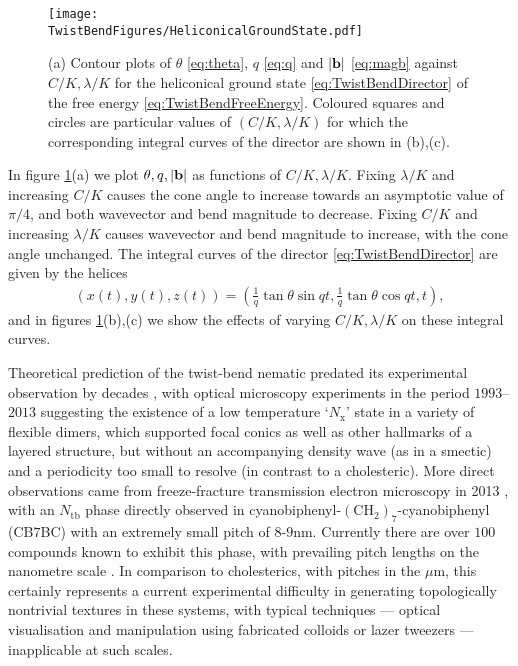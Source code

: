 \begin{figure}[htbp]
    \centering
    \texttt{[image: \\TwistBendFigures/HeliconicalGroundState.pdf]}
    \caption[Heliconical ground state of a twist-bend nematic.]{(a) Contour plots of $\theta$ \eqref{eq:theta}, $q$ \eqref{eq:q} and $|{\bf b}|$ \eqref{eq:magb} against $C/K, \lambda/K$ for the heliconical ground state \eqref{eq:TwistBendDirector} of the free energy \eqref{eq:TwistBendFreeEnergy}. Coloured squares and circles are particular values of $(C/K, \lambda /K)$ for which the corresponding integral curves of the director are shown in (b),(c).}
    \label{fig:HeliconicalGroundState}
\end{figure}
In figure \ref{fig:HeliconicalGroundState}(a) we plot $\theta, q, |\mathbf{b}|$ as functions of $C/K, \lambda/K$. Fixing $\lambda/K$ and increasing $C/K$ causes the cone angle to increase towards an asymptotic value of $\pi/4$, and both wavevector and bend magnitude to decrease. Fixing $C/K$ and increasing $\lambda/K$ causes wavevector and bend magnitude to increase, with the cone angle unchanged. The integral curves of the director \eqref{eq:TwistBendDirector} are given by the helices
\begin{align}
    (x(t),y(t),z(t)) = (\frac{1}{q} \tan \theta \sin qt, \frac{1}{q} \tan \theta \cos qt,t),
\end{align}
and in figures \ref{fig:HeliconicalGroundState}(b),(c) we show the effects of varying $C/K, \lambda/K$ on these integral curves.

Theoretical prediction of the twist-bend nematic predated its experimental observation by decades \citep{Lavrentovich2018}, with optical microscopy experiments in the period $1993$--$2013$ suggesting the existence of a low temperature `$N_\mathrm{x}$' state in a variety of flexible dimers, which supported focal conics as well as other hallmarks of a layered structure, but without an accompanying density wave (as in a smectic) and a periodicity too small to resolve (in contrast to a cholesteric). More direct observations came from freeze-fracture transmission electron microscopy in 2013 \citep{Borshch2013}, with an $N_{\mathrm{tb}}$ phase directly observed in cyanobiphenyl-$(\mathrm{CH}_2)_7$-cyanobiphenyl (CB$7$BC) with an extremely small pitch of $8$-$9$nm. Currently there are over $100$ compounds known to exhibit this phase, with prevailing pitch lengths on the nanometre scale \citep{Lavrentovich2018}. In comparison to cholesterics, with pitches in the $\mu$m, this certainly represents a current experimental difficulty in generating topologically nontrivial textures in these systems, with typical techniques --- optical visualisation and manipulation using fabricated colloids \citep{Tasinkevych2014} or lazer tweezers \citep{Tkalec2011,Copar2015,Ackerman2017} --- inapplicable at such scales. 
\label{sec:GeometryTopologyOfBend}
